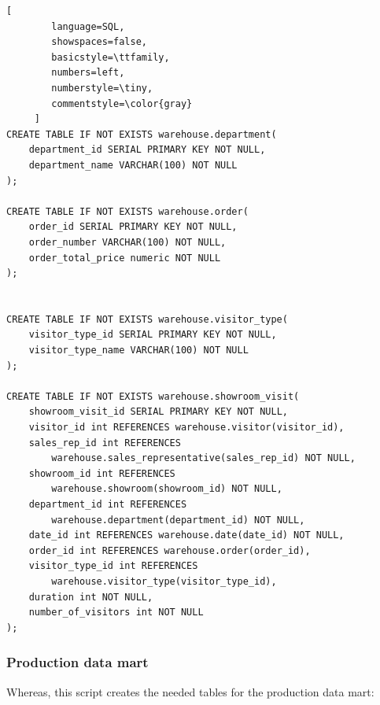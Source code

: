 \documentclass[letterpaper,12pt]{article}
\begin{document}
\begin{lstlisting}[
        language=SQL,
        showspaces=false,
        basicstyle=\ttfamily,
        numbers=left,
        numberstyle=\tiny,
        commentstyle=\color{gray}
     ]
CREATE TABLE IF NOT EXISTS warehouse.department(
	department_id SERIAL PRIMARY KEY NOT NULL,
	department_name VARCHAR(100) NOT NULL
);

CREATE TABLE IF NOT EXISTS warehouse.order(
	order_id SERIAL PRIMARY KEY NOT NULL,
	order_number VARCHAR(100) NOT NULL,
	order_total_price numeric NOT NULL
);


CREATE TABLE IF NOT EXISTS warehouse.visitor_type(
	visitor_type_id SERIAL PRIMARY KEY NOT NULL,
	visitor_type_name VARCHAR(100) NOT NULL
);

CREATE TABLE IF NOT EXISTS warehouse.showroom_visit(
	showroom_visit_id SERIAL PRIMARY KEY NOT NULL,
	visitor_id int REFERENCES warehouse.visitor(visitor_id),
	sales_rep_id int REFERENCES 
		warehouse.sales_representative(sales_rep_id) NOT NULL,
	showroom_id int REFERENCES 
		warehouse.showroom(showroom_id) NOT NULL,
	department_id int REFERENCES 
		warehouse.department(department_id) NOT NULL,
	date_id int REFERENCES warehouse.date(date_id) NOT NULL,
	order_id int REFERENCES warehouse.order(order_id),
	visitor_type_id int REFERENCES 
		warehouse.visitor_type(visitor_type_id),
	duration int NOT NULL,
	number_of_visitors int NOT NULL
);

\end{lstlisting}


\subsubsection{Production data mart}
Whereas, this script creates the needed tables for the production data mart:
\end{document}
